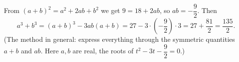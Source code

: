 From $(a+b)^2=a^2+2ab+b^2$ we get $9=18+2ab$, so $ab=-\dfrac{9}{2}$. Then
\[
a^3+b^3=(a+b)^3-3ab(a+b)=27-3\cdot\left(-\dfrac{9}{2}\right)\cdot3=27+\dfrac{81}{2}=\boxed{\dfrac{135}{2}} .
\]
(The method in general: express everything through the symmetric quantities $a+b$ and $ab$. Here $a,b$ are real, the roots of $t^2-3t-\dfrac{9}{2}=0$.)
